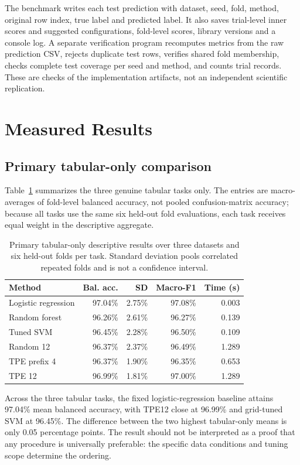 \documentclass[11pt,a4paper]{article}
\begin{document}
The benchmark writes each test prediction with dataset, seed, fold, method, original row index, true label and predicted label. It also saves trial-level inner scores and suggested configurations, fold-level scores, library versions and a console log. A separate verification program recomputes metrics from the raw prediction CSV, rejects duplicate test rows, verifies shared fold membership, checks complete test coverage per seed and method, and counts trial records. These are checks of the implementation artifacts, not an independent scientific replication.

\section{Measured Results}
\subsection{Primary tabular-only comparison}
Table~\ref{tab:tabular} summarizes the three genuine tabular tasks only. The entries are macro-averages of fold-level balanced accuracy, not pooled confusion-matrix accuracy; because all tasks use the same six held-out fold evaluations, each task receives equal weight in the descriptive aggregate.

\begin{table}[H]
\centering\caption{Primary tabular-only descriptive results over three datasets and six held-out folds per task. Standard deviation pools correlated repeated folds and is not a confidence interval.}
\label{tab:tabular}
\small\begin{tabular}{lrrrr}\toprule
Method & Bal. acc. & SD & Macro-F1 & Time (s)\\\midrule
Logistic regression & 97.04\% & 2.75\% & 97.08\% & 0.003 \\
Random forest & 96.26\% & 2.61\% & 96.27\% & 0.139 \\
Tuned SVM & 96.45\% & 2.28\% & 96.50\% & 0.109 \\
Random 12 & 96.37\% & 2.37\% & 96.49\% & 1.289 \\
TPE prefix 4 & 96.37\% & 1.90\% & 96.35\% & 0.653 \\
TPE 12 & 96.99\% & 1.81\% & 97.00\% & 1.289 \\
\bottomrule\end{tabular}
\end{table}

Across the three tabular tasks, the fixed logistic-regression baseline attains 97.04\% mean balanced accuracy, with TPE12 close at 96.99\% and grid-tuned SVM at 96.45\%. The difference between the two highest tabular-only means is only 0.05 percentage points. The result should not be interpreted as a proof that any procedure is universally preferable: the specific data conditions and tuning scope determine the ordering.
\end{document}
